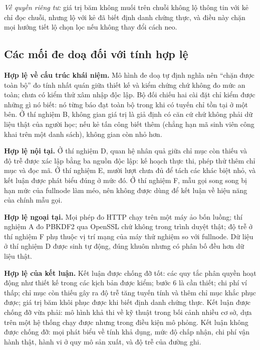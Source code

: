 \textit{Về quyền riêng tư:} giá trị băm không muối trên chuỗi không lộ thông tin với kẻ chỉ đọc chuỗi, nhưng lộ với kẻ đã biết định danh chứng thực, và điều này chặn mọi hướng tiết lộ chọn lọc nếu không thay đổi cách neo.

\subsection{Các mối đe doạ đối với tính hợp lệ}

\textbf{Hợp lệ về cấu trúc khái niệm.} Mô hình đe doạ tự định nghĩa nên ``chặn được toàn bộ'' đo tính nhất quán giữa thiết kế và kiểm chứng chứ không đo mức an toàn; chưa có kiểm thử xâm nhập độc lập. Bộ đối chiếu hai cài đặt chỉ kiểm được những gì nó biết: nó từng báo đạt toàn bộ trong khi có tuyến chỉ tồn tại ở một bên. Ở thí nghiệm B, không gian giá trị là giả định có căn cứ chứ không phải dữ liệu thật của người học; nếu kẻ tấn công biết thêm (chẳng hạn mã sinh viên công khai trên một danh sách), không gian còn nhỏ hơn.

\textbf{Hợp lệ nội tại.} Ở thí nghiệm D, quan hệ nhân quả giữa chỉ mục còn thiếu và độ trễ được xác lập bằng ba nguồn độc lập: kế hoạch thực thi, phép thử thêm chỉ mục và đọc mã. Ở thí nghiệm E, mười lượt chưa đủ để tách các khác biệt nhỏ, và kết luận được phát biểu đúng ở mức đó. Ở thí nghiệm F, mẫu gọi song song bị hạn mức của fullnode làm méo, nên không được dùng để kết luận về hiệu năng của chính mẫu gọi.

\textbf{Hợp lệ ngoại tại.} Mọi phép đo HTTP chạy trên một máy ảo bốn luồng; thí nghiệm A đo PBKDF2 qua OpenSSL chứ không trong trình duyệt thật; độ trễ ở thí nghiệm F phụ thuộc vị trí mạng của máy thử nghiệm so với fullnode. Dữ liệu ở thí nghiệm D được sinh tự động, đúng khuôn nhưng có phân bố đều hơn dữ liệu thật.

\textbf{Hợp lệ của kết luận.} Kết luận được chống đỡ tốt: các quy tắc phân quyền hoạt động như thiết kế trong các kịch bản được kiểm; bước 6 là cần thiết; chi phí ví thấp; chỉ mục còn thiếu gây ra độ trễ tăng tuyến tính và thêm chỉ mục khắc phục được; giá trị băm khôi phục được khi biết định danh chứng thực. Kết luận được chống đỡ vừa phải: mô hình khả thi về kỹ thuật trong bối cảnh nhiều cơ sở, dựa trên một hệ thống chạy được nhưng trong điều kiện mô phỏng. Kết luận không được chống đỡ: mọi phát biểu về tính khả dụng, mức độ chấp nhận, chi phí vận hành thật, hành vi ở quy mô sản xuất, và độ trễ của đường ghi.
